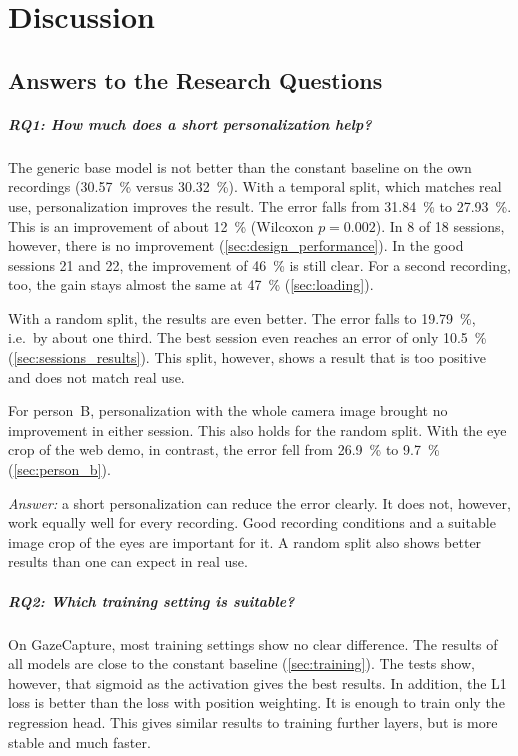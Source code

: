 \chapter{Discussion}
\label{ch:diskussion}

\section{Answers to the Research Questions}
\label{sec:antworten}

\paragraph{RQ1: How much does a short personalization help?}
The generic base model is not better than the constant baseline on the own
recordings (\SI{30.57}{\percent} versus \SI{30.32}{\percent}). With a temporal
split, which matches real use, personalization improves the result. The error
falls from \SI{31.84}{\percent} to \SI{27.93}{\percent}. This is an improvement
of about \SI{12}{\percent} (Wilcoxon $p=0.002$). In 8 of 18 sessions, however,
there is no improvement (\cref{sec:design_performance}). In the good sessions 21
and 22, the improvement of \SI{46}{\percent} is still clear. For a second
recording, too, the gain stays almost the same at \SI{47}{\percent}
(\cref{sec:loading}).

With a random split, the results are even better. The error falls to
\SI{19.79}{\percent}, i.e.\ by about one third. The best session even reaches an
error of only \SI{10.5}{\percent} (\cref{sec:sessions_results}). This split,
however, shows a result that is too positive and does not match real use.

For person~B, personalization with the whole camera image brought no
improvement in either session. This also holds for the random split. With the
eye crop of the web demo, in contrast, the error fell from \SI{26.9}{\percent}
to \SI{9.7}{\percent} (\cref{sec:person_b}).

\emph{Answer:} a short personalization can reduce the error clearly. It does
not, however, work equally well for every recording. Good recording conditions
and a suitable image crop of the eyes are important for it. A random split also
shows better results than one can expect in real use.

\paragraph{RQ2: Which training setting is suitable?}
On GazeCapture, most training settings show no clear difference. The results of
all models are close to the constant baseline (\cref{sec:training}). The tests
show, however, that sigmoid as the activation gives the best results. In
addition, the L1 loss is better than the loss with position weighting. It is
enough to train only the regression head. This gives similar results to
training further layers, but is more stable and much faster.

